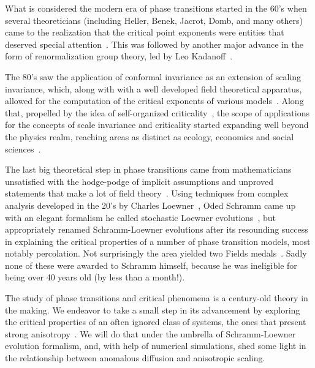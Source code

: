What is considered the modern era of phase transitions started in the 60's when
several theoreticians (including Heller, Benek, Jacrot, Domb, and many others)
came to the realization that the critical point exponents were entities that
deserved special attention~\cite{Stanley1999, Stanley1971}. This was followed
by another major advance in the form of renormalization group theory, led by
Leo Kadanoff~\cite{Kadanoff1966}.

The 80's saw the application of conformal invariance as an extension of scaling
invariance, which, along with with a well developed field theoretical
apparatus, allowed for the computation of the critical exponents of various
models~\cite{Belavin1984, Henkel2013}. Along that, propelled by the idea of
self-organized criticality~\cite{Bak1987}, the scope of applications for the
concepts of scale invariance and criticality started expanding well beyond the
physics realm, reaching areas as distinct as ecology, economics and social
sciences~\cite{Bak1996, Christensen2005}.

The last big theoretical step in phase transitions came from mathematicians
unsatisfied with the hodge-podge of implicit assumptions and unproved
statements that make a lot of field theory~\cite{Langlands1994, Cardy2005}.
Using techniques from complex analysis developed in the 20's by Charles
Loewner~\cite{Loewner1923}, Oded Schramm came up with an elegant formalism he
called stochastic Loewner evolutions~\cite{Schramm2000}, but appropriately
renamed Schramm-Loewner evolutions after its resounding success in explaining
the critical properties of a number of phase transition models, most notably
percolation. Not surprisingly the area yielded two Fields
medals~\cite{Mackenzie2006, Kesten2010}. Sadly none of these were awarded to
Schramm himself, because he was ineligible for being over 40 years old (by less
than a month!).

The study of phase transitions and critical phenomena is a century-old theory
in the making. We endeavor to take a small step in its advancement by exploring
the critical properties of an often ignored class of systems, the ones that
present strong anisotropy~\cite{Henkel1994}. We will do that under the umbrella
of Schramm-Loewner evolution formalism, and, with help of numerical
simulations, shed some light in the relationship between anomalous diffusion
and anisotropic scaling.
